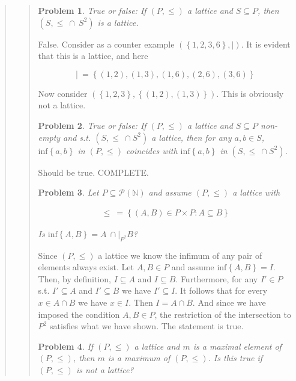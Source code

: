 \documentclass[a4paper, 12pt]{article}
\newtheorem{problem}{Problem}
\newtheorem{problem}{Problem}
\begin{document}
\begin{quote}
\begin{quote}
   \begin{problem}
       True or false: If $(P, \leq) $ a lattice and $S \subseteq P$, then $(S,
       \leq ~ \cap ~ S^2)$ is a lattice.
   \end{problem}

   False. Consider as a counter example $(\left\{ 1, 2, 3, 6 \right\}, \mid )$.
   It is evident that this is a lattice, and here 

   $$\mid ~ = \left\{ (1, 2), (1,3), (1,6), (2, 6), (3, 6)\right\} $$

   Now consider $\left( \left\{ 1, 2, 3 \right\}, \left\{ (1, 2), (1, 3)
   \right\}   \right) $. This is obviously not a lattice.

\begin{problem}
    True or false: If $(P, \leq) $ a lattice and $S \subseteq P$ non-empty and
    s.t. $(S, \leq ~ \cap S^2)$ a lattice, then for any $a, b \in S$,
    $\text{inf}\left\{ a, b \right\} $ in $(P, \leq) $ coincides with
    $\text{inf}\left\{ a, b \right\} $ in $(S, \leq ~ \cap S^2)$.
\end{problem}

Should be true. COMPLETE.

\begin{problem}
    Let $P \subseteq \mathcal{P}(\mathbb{N})$ and assume $(P, \leq)$ a lattice
    with 

    \begin{align*}
        \leq ~ = \left\{ (A, B) \in P \times P : A \subseteq B \right\} 
    \end{align*}

    Is $\text{inf}\left\{ A, B \right\} = A ~ \cap |_{P^2} B $?
\end{problem}

Since $(P, \leq) $ a lattice we know the infimum of any pair of elements always
exist. Let $A, B \in P$ and assume $\text{inf}\left\{ A, B \right\} = I $. Then,
by definition, $I \subseteq A$ and $I \subseteq B$. Furthermore, for any $I' \in
P$ s.t. $I' \subseteq A$ and $I' \subseteq B$ we have $I' \subseteq I$. It
follows that for every $x \in A \cap B$ we have $x \in I$. Then $I = A \cap B$.
And since we have imposed the condition $A, B \in P$, the restriction of the
intersection to $P^2$ satisfies what we have shown. The statement is true.

\begin{problem}
    If $(P, \leq) $ a lattice and $m$ is a maximal element of $(P, \leq) $,
    then $m$ is a maximum of $(P, \leq) $. Is this true if $(P, \leq) $ is not a
    lattice?
\end{problem}


\end{quote}
\end{quote}
\end{document}
